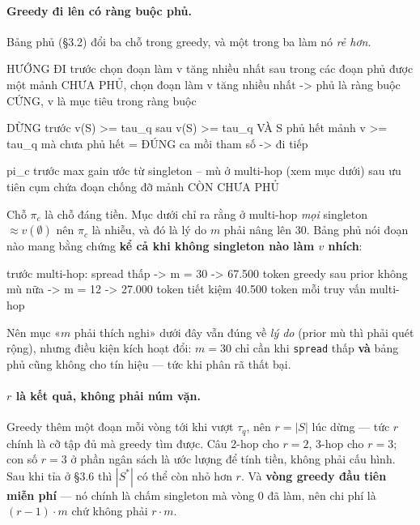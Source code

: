 \documentclass[11pt,a4paper]{article}
\begin{document}
\paragraph{Greedy đi lên có ràng buộc phủ.} Bảng phủ (\S3.2) đổi ba chỗ trong greedy, và một
trong ba làm nó \emph{rẻ hơn}.

\begin{dia}
HƯỚNG ĐI   trước   chọn đoạn làm v tăng nhiều nhất
           sau     trong các đoạn phủ được một mảnh CHƯA PHỦ,
                   chọn đoạn làm v tăng nhiều nhất
                   -> phủ là ràng buộc CỨNG, v là mục tiêu trong ràng buộc

DỪNG       trước   v(S) >= tau_q
           sau     v(S) >= tau_q  VÀ  S phủ hết mảnh
                   v >= tau_q mà chưa phủ hết = ĐÚNG ca mồi tham số -> đi tiếp

pi_c       trước   max gain ước từ singleton -- mù ở multi-hop (xem mục dưới)
           sau     ưu tiên cụm chứa đoạn chống đỡ mảnh CÒN CHƯA PHỦ
\end{dia}

Chỗ $\pi_c$ là chỗ đáng tiền. Mục dưới chỉ ra rằng ở multi-hop \emph{mọi} singleton
$\approx v(\emptyset)$ nên $\pi_c$ là nhiễu, và đó là lý do $m$ phải nâng lên 30. Bảng phủ nói
đoạn nào mang bằng chứng \textbf{kể cả khi không singleton nào làm $v$ nhích}:

\begin{dia}
trước   multi-hop: spread thấp -> m = 30 -> 67.500 token greedy
sau     prior không mù nữa      -> m = 12 -> 27.000 token
                                   tiết kiệm 40.500 token mỗi truy vấn multi-hop
\end{dia}

Nên mục «$m$ phải thích nghi» dưới đây vẫn đúng về \emph{lý do} (prior mù thì phải quét rộng),
nhưng điều kiện kích hoạt đổi: $m=30$ chỉ cần khi \texttt{spread} thấp \textbf{và} bảng phủ
cũng không cho tín hiệu --- tức khi phân rã thất bại.

\paragraph{$r$ là kết quả, không phải núm vặn.} Greedy thêm một đoạn mỗi vòng tới khi vượt
$\tau_q$, nên $r=|S|$ lúc dừng --- tức $r$ chính là cỡ tập đủ mà greedy tìm được. Câu 2-hop
cho $r=2$, 3-hop cho $r=3$; con số $r=3$ ở phần ngân sách là ước lượng để tính tiền, không
phải cấu hình. Sau khi tỉa ở \S3.6 thì $|S^*|$ có thể còn nhỏ hơn $r$. Và \textbf{vòng greedy
đầu tiên miễn phí} --- nó chính là chấm singleton mà vòng 0 đã làm, nên chi phí là
$(r-1)\cdot m$ chứ không phải $r\cdot m$.
\end{document}
